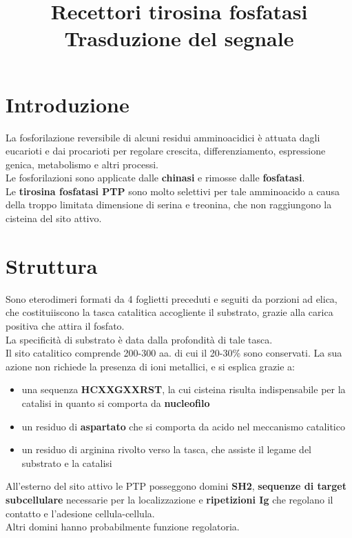 \documentclass[a4paper, 12pt]{article}
\date{}
\title{%
  Recettori tirosina fosfatasi \\
  \large Trasduzione del segnale
}
\begin{document}
\maketitle

\section{Introduzione}
La fosforilazione reversibile di alcuni residui amminoacidici è attuata dagli eucarioti e dai procarioti per regolare crescita, differenziamento, espressione genica, metabolismo e altri processi.\\
Le fosforilazioni sono applicate dalle \textbf{chinasi} e rimosse dalle \textbf{fosfatasi}.\\
Le \textbf{tirosina fosfatasi PTP} sono molto selettivi per tale amminoacido a causa della troppo limitata dimensione di serina e treonina, che non raggiungono la cisteina del sito attivo.

\section{Struttura}
Sono eterodimeri \textalpha\textbeta formati da 4 foglietti preceduti e seguiti da porzioni ad elica, che costituiiscono la tasca catalitica accogliente il substrato, grazie alla carica positiva che attira il fosfato.\\
La specificità di substrato è data dalla profondità di tale tasca.\\
Il sito catalitico comprende 200-300 aa. di cui il 20-30\% sono conservati. La sua azione non richiede la presenza di ioni metallici, e si esplica grazie a:
\begin{itemize}
  \item una sequenza \textbf{HCXXGXXRST}, la cui cisteina risulta indispensabile per la catalisi in quanto si comporta da \textbf{nucleofilo}
  \item un residuo di \textbf{aspartato} che si comporta da acido nel meccanismo catalitico
  \item un residuo di arginina rivolto verso la tasca, che assiste il legame del substrato e la catalisi
\end{itemize}
All'esterno del sito attivo le PTP posseggono domini \textbf{SH2}, \textbf{sequenze di target subcellulare} necessarie per la localizzazione e \textbf{ripetizioni Ig} che regolano il contatto e l'adesione cellula-cellula.\\
Altri domini hanno probabilmente funzione regolatoria.
\end{document}
